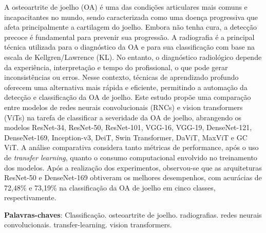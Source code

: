 
\setlength{\absparsep}{18pt} %
\begin{resumo}
A osteoartrite de joelho (OA) é uma das condições articulares mais comuns e incapacitantes no mundo, sendo caracterizada como uma doença progressiva que afeta principalmente a cartilagem do joelho. Embora não tenha cura, a detecção precoce é fundamental para prevenir sua progressão. A radiografia é a principal técnica utilizada para o diagnóstico da OA e para sua classificação com base na escala de Kellgren/Lawrence (KL). No entanto, o diagnóstico radiológico depende da experiência, interpretação e tempo do profissional, o que pode gerar inconsistências ou erros. Nesse contexto, técnicas de aprendizado profundo oferecem uma alternativa mais rápida e eficiente, permitindo a automação da detecção e classificação da OA de joelho. Este estudo propõe uma comparação entre modelos de redes neurais convolucionais (RNCs) e vision transformers (ViTs) na tarefa de classificar a severidade da OA de joelho, abrangendo os modelos ResNet-34, ResNet-50, ResNet-101, VGG-16, VGG-19, DenseNet-121, DenseNet-169, Inception-v3, DeiT, Swin Transformer, DaViT, MaxViT e GC ViT. A análise comparativa considera tanto métricas de performance, após o uso de \textit{transfer learning}, quanto o consumo computacional envolvido no treinamento dos modelos. Após a realização dos experimentos, observou-se que as arquiteturas ResNet-50 e DenseNet-169 obtiveram os melhores desempenhos, com acurácias de 72,48\% e 73,19\% na classificação da OA de joelho em cinco classes, respectivamente.

 \textbf{Palavras-chaves}: Classificação. osteoartrite de joelho. radiografias. redes neurais convolucionais. transfer-learning. vision transformers.
\end{resumo}

